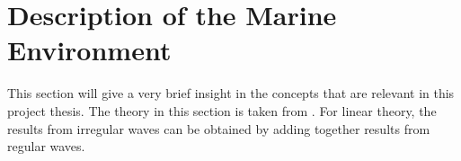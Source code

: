 \chapter{Description of the Marine Environment}
\label{chap:enviroment}
This section will give a very brief insight in the concepts that are relevant in this project thesis. The theory in this section is taken from \cite{Faltinsen1990}.  For linear theory, the results from irregular waves can be obtained by adding together results from regular waves.